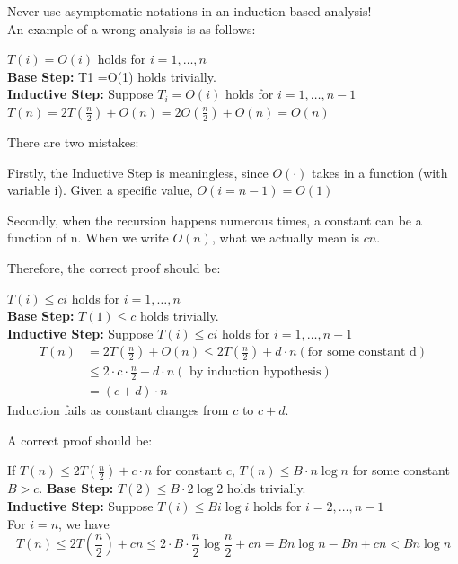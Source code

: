 \begin{remark} Never use asymptomatic notations in an induction-based analysis!\\
An example of a wrong analysis is as follows:
\begin{prf} $T(i) = O(i)$ holds for $i=1,\ldots,n$ \\
\textbf{Base Step:} T1 =O(1) holds trivially.\\
\textbf{Inductive Step:} Suppose $T_i=O(i)$ holds for $i=1,\ldots,n-1$ \\
$T(n)=2T(\frac{n}{2})+O(n)=2O(\frac{n}{2})+O(n)=O(n)$ 
\end{prf}
There are two mistakes:

Firstly, the Inductive Step is meaningless, since $O(\cdot)$ takes in a function (with variable i). Given a specific value, $O(i=n-1)=O(1)$

Secondly, when the recursion happens numerous times, a constant can be a function of n. When we write $O(n)$, what we actually mean is $cn$.

Therefore, the correct proof should be:
\begin{prf} 
    $T(i) \leq ci$ holds for $i=1,\ldots,n$ \\
    \textbf{Base Step:} $T(1) \leq c$ holds trivially.\\
    \textbf{Inductive Step:} Suppose $T(i) \leq ci$ holds for $i=1,\ldots,n-1$ \\
    \[
    \begin{aligned}
    T(n)&=2T(\frac{n}{2})+O(n) \leq 2T(\frac{n}{2})+d\cdot n (\text{for some constant d})\\
    &\leq 2\cdot c\cdot \frac{n}{2}+d\cdot n (\text{ by induction hypothesis})\\
    &=(c+d)\cdot n
    \end{aligned}
    \]
    Induction fails as constant changes from $c$ to $c+d$.
\end{prf}
A correct proof should be:
\begin{prf}
    If $T(n) \leq 2T(\frac{n}{2})+c\cdot n$ for constant $c$, $T(n) \leq B \cdot n\log n$ for some constant \textbf{$B>c$}.
    \textbf{Base Step:} $T(2) \leq B\cdot 2\log 2$ holds trivially.\\
    \textbf{Inductive Step:} Suppose $T(i) \leq Bi\log i$ holds for $i=2,\ldots,n-1$ \\
    For $i=n$, we have\\
    \[
        T(n)\leq 2T(\frac{n}{2})+cn \leq 2\cdot B\cdot \frac{n}{2} \log \frac{n}{2}+cn=Bn \log n -Bn+cn < Bn \log n \]
\end{prf}
\end{remark}

